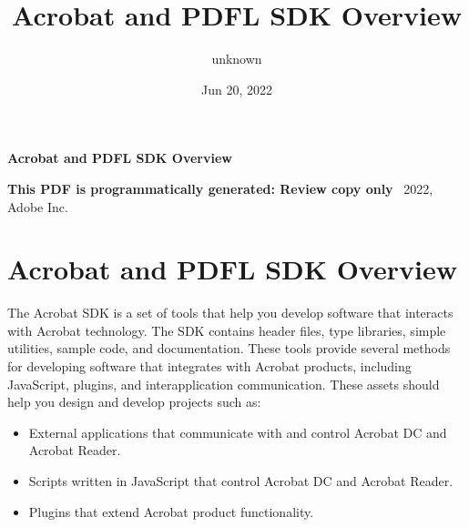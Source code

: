 \documentclass[letterpaper,12pt,english,openany,oneside]{sphinxmanual}
\title{Acrobat and PDFL SDK Overview}
\date{Jun 20, 2022}
\author{unknown}
\begin{document}
\pagestyle{empty}

    \begin{titlepage}
        \begin{figure}[h]
        \end{figure}
        \centering
        \vspace*{40mm}
        \textbf{\Huge Acrobat and PDFL SDK Overview}

        \vspace{15mm}
        \Large \textbf{{This PDF is programmatically generated: Review copy only}}
        \vfill
        \small \textcopyright\ 2022, Adobe Inc.
    \end{titlepage}
    \clearpage
    \tableofcontents
    \clearpage
    
\pagestyle{plain}

\pagestyle{normal}
\label{\detokenize{toc::doc}}





\chapter{Acrobat and PDFL SDK Overview}
\label{\detokenize{index:acrobat-and-pdfl-sdk-overview}}\label{\detokenize{index::doc}}
The Acrobat SDK is a set of tools that help you develop software that interacts with Acrobat technology. The SDK contains header files, type libraries, simple utilities, sample code, and documentation. These tools provide several methods for developing software that integrates with Acrobat products, including JavaScript, plugins, and interapplication communication. These assets should help you design and develop projects such as:
\begin{itemize}
\item {} 
External applications that communicate with and control Acrobat DC and Acrobat Reader.

\item {} 
Scripts written in JavaScript that control Acrobat DC and Acrobat Reader.

\item {} 
Plug\sphinxhyphen{}ins that extend Acrobat product functionality.

\end{itemize}
\end{document}
